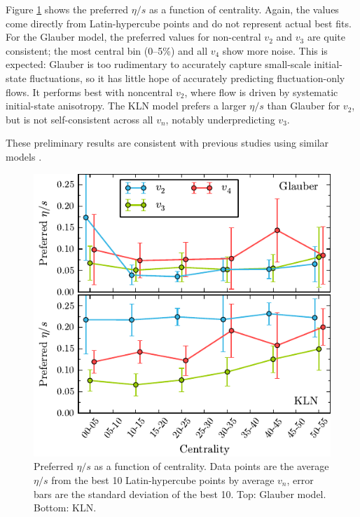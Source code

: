 \documentclass[reprint,amsmath]{revtex4-1}
\begin{document}
Figure \ref{fig:preferredeta} shows the preferred $\eta/s$ as a function of centrality.  Again, the values come directly from
Latin-hypercube points and do not represent actual best fits.  For the Glauber model, the preferred values for non-central $v_2$ and $v_3$
are quite consistent; the most central bin (0--5\%) and all $v_4$ show more noise.  This is expected:  Glauber is too rudimentary to
accurately capture small-scale initial-state fluctuations, so it has little hope of accurately predicting fluctuation-only flows.  It
performs best with noncentral $v_2$, where flow is driven by systematic initial-state anisotropy.  The KLN model prefers a larger $\eta/s$
than Glauber for $v_2$, but is not self-consistent across all $v_n$, notably underpredicting $v_3$.

These preliminary results are consistent with previous studies using similar models \cite{song,osu1,osu2}.


\begin{figure}[t]
  \centering
  \includegraphics{preferredeta}
  \caption{Preferred $\eta/s$ as a function of centrality.  Data points are the average $\eta/s$ from the best 10 Latin-hypercube points by
  average $v_n$, error bars are the standard deviation of the best 10.  Top:  Glauber model.  Bottom:  KLN.}
  \label{fig:preferredeta}
\end{figure}
\end{document}
